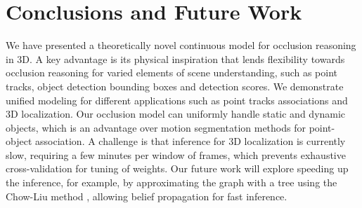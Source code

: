\section{Conclusions and Future Work}
\label{sec:conclusions}

We have presented a theoretically novel continuous model for occlusion reasoning in 3D. A key advantage is its physical inspiration that lends flexibility towards occlusion reasoning for varied elements of scene understanding, such as point tracks, object detection bounding boxes and detection scores. We demonstrate unified modeling for different applications such as point tracks associations and 3D localization. Our occlusion model can uniformly handle static and dynamic objects, which is an advantage over motion segmentation methods for point-object association. A challenge is that inference for 3D localization is currently slow, requiring a few minutes per window of frames, which prevents exhaustive cross-validation for tuning of weights. Our future work will explore speeding up the inference, for example, by approximating the graph with a tree using the Chow-Liu method \cite{chow1968approximating}, allowing belief propagation for fast inference.




